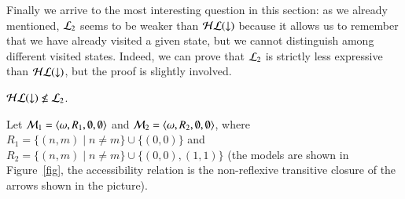 Finally we arrive to the most interesting question in this section:
as we already mentioned, $\mathcal{L}_2$ seems to be weaker than $\mathcal{HL}({\downarrow})$
because it allows us to remember that we have already visited a
given state, but we cannot distinguish among different visited
states. Indeed, we can prove that $\mathcal{L}_2$ is strictly less
expressive than $\mathcal{HL}({\downarrow})$, but the proof is slightly involved.


\begin{thm} \label{thm:tle_not_equal_hlogic}
$\mathcal{HL}({\downarrow})\not\leq\mathcal{L}_2$.
\end{thm}

\begin{pf}
Let $\mathcal{M}_1=\langle \omega,R_1,\emptyset,\emptyset \rangle$ and
$\mathcal{M}_2=\langle \omega,R_2,\emptyset,\emptyset \rangle$, where $R_1=\{(n,m)
\mid n\not= m\} \cup \{(0,0)\}$ and $R_2=\{(n,m) \mid n\not= m\}
\cup \{(0,0),(1,1)\}$ (the models are shown in Figure~\ref{fig}, the
accessibility relation is the non-reflexive transitive closure of the arrows shown
in the picture).

%
%
%
%
%
%
%
%


\end{pf}
